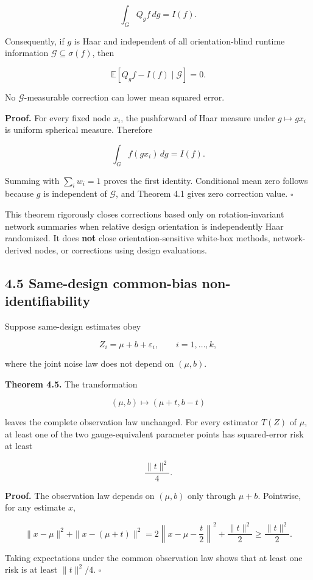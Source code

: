 \documentclass[
  10pt,
]{article}
\begin{document}
\[
\int_G Q_gf\,dg=I(f).
\]

Consequently, if \(g\) is Haar and independent of all orientation-blind
runtime information \(\mathcal G\subseteq\sigma(f)\), then

\[
\mathbb E[Q_gf-I(f)\mid\mathcal G]=0.
\]

No \(\mathcal G\)-measurable correction can lower mean squared error.

\textbf{Proof.} For every fixed node \(x_i\), the pushforward of Haar
measure under \(g\mapsto gx_i\) is uniform spherical measure. Therefore

\[
\int_G f(gx_i)\,dg=I(f).
\]

Summing with \(\sum_iw_i=1\) proves the first identity. Conditional mean
zero follows because \(g\) is independent of \(\mathcal G\), and Theorem
4.1 gives zero correction value. \(\square\)

This theorem rigorously closes corrections based only on
rotation-invariant network summaries when relative design orientation is
independently Haar randomized. It does \textbf{not} close
orientation-sensitive white-box methods, network-derived nodes, or
corrections using design evaluations.

\subsection{4.5 Same-design common-bias
non-identifiability}\label{same-design-common-bias-non-identifiability}

Suppose same-design estimates obey

\[
Z_i=\mu+b+\varepsilon_i,
\qquad i=1,\ldots,k,
\]

where the joint noise law does not depend on \((\mu,b)\).

\textbf{Theorem 4.5.} The transformation

\[
(\mu,b)\mapsto(\mu+t,b-t)
\]

leaves the complete observation law unchanged. For every estimator
\(T(Z)\) of \(\mu\), at least one of the two gauge-equivalent parameter
points has squared-error risk at least

\[
\frac{\|t\|^2}{4}.
\]

\textbf{Proof.} The observation law depends on \((\mu,b)\) only through
\(\mu+b\). Pointwise, for any estimate \(x\),

\[
\|x-\mu\|^2+
\|x-(\mu+t)\|^2
=
2\left\|x-\mu-\frac t2\right\|^2+
\frac{\|t\|^2}{2}
\ge
\frac{\|t\|^2}{2}.
\]

Taking expectations under the common observation law shows that at least
one risk is at least \(\|t\|^2/4\). \(\square\)
\end{document}
